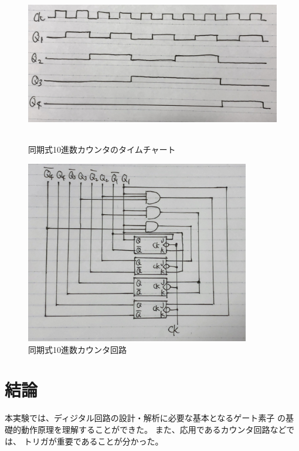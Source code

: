 \documentclass[12pt]{jarticle}
\begin{document}
\begin{figure}[h]
    \begin{center}
        \includegraphics[bb=0 0 2574 1218,height=7cm]{report3_fig3.jpg}
    \end{center}
    \caption{同期式10進数カウンタのタイムチャート}
    \label{fig3}
\end{figure}
\begin{figure}[h]
    \begin{center}
        \includegraphics[bb=0 0 1585 1292,height=8cm]{report3_fig4.jpg}
    \end{center}
    \caption{同期式10進数カウンタ回路}
    \label{fig4}
\end{figure}

\clearpage
\section{結論}
本実験では、ディジタル回路の設計・解析に必要な基本となるゲート素子
の基礎的動作原理を理解することができた。
また、応用であるカウンタ回路などでは、
トリガが重要であることが分かった。
\end{document}
